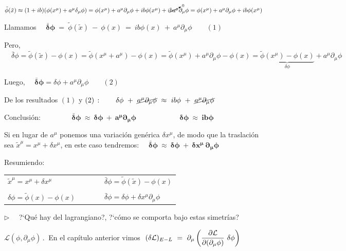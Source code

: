 $\tilde \phi(\tilde x)\approx (1+ib)(\phi(x^\mu)+a^\mu \delta_\mu \phi)=
\phi(x^\mu)+a^\mu \partial_\mu \phi+ ib \phi(x^\mu)+i \cancelto{0}{b a^\mu} \partial_\mu \phi=\phi(x^\mu)+a^\mu \partial_\mu \phi+ ib \phi(x^\mu)$


Llamamos $\quad \boldsymbol{\bar \delta \phi} \ = \ \tilde \phi(\tilde x) \ - \ \phi(x) \ = \ ib \phi(x) \ + \ a^\mu \partial_\mu \phi \qquad (1)$

Pero, $\quad \bar \delta \phi= \tilde \phi(\tilde x) -\phi(x)=\tilde \phi(x^\mu+a^\mu)-\phi(x)= \tilde \phi(x^\mu)+a^\mu \partial_\mu \phi - \phi(x)= \underbrace{ \tilde \phi(x^\mu)-\phi(x) }_{\delta \phi} + a^\mu \partial_\mu \phi$

Luego, $\quad \boldsymbol{ \bar \delta \phi}=\delta \phi +a^\mu \partial_\mu \phi \qquad (2)$

De los resultados $(1)$ y $(2)\, : \qquad \delta \phi \ + \ \cancel{ a^\mu \partial_\mu \phi} \  \approx \  ib \phi \ +\ \cancel{ a^\mu \partial_\mu \phi}$

Conclusión: $\qquad \qquad \boldsymbol{\bar \delta \phi \ \approx \ \delta \phi \ + \ a^\mu \partial_\mu \phi  \qquad \qquad \qquad \delta \phi \ \approx \ ib\phi }$

\vspace{5mm} Si en lugar de $a^\mu$ ponemos una variación genérica $\delta x^\mu$, de modo que la traslación sea $\tilde x^\mu = x^\mu+\delta x^\mu$, en este caso tendremos: $\quad \boldsymbol{\bar \delta \phi \ \approx \ \delta \phi \ + \ \delta x^\mu \ \partial_\mu \phi}$

Resumiendo:

\begin{table}[H]
\center
\begin{tabular}{lll}
$\tilde x^\mu = x^\mu+\delta x^\mu$  &  $\qquad$ &  $\bar \delta \phi=\tilde \phi (\tilde x)-\phi(x)$ \\ \\
$\delta \phi=\tilde \phi(x)-\phi(x)$ &  $\qquad$ &  $\bar \delta \phi=\delta \phi+\delta x^\mu \partial_\mu \phi$
\end{tabular}
\end{table}

\vspace{5mm} $\triangleright \quad$ ?`Qué hay del lagrangiano?, ?`cómo se comporta bajo estas simetrías?

$\mathcal L(\phi, \partial_\mu \phi)\, . \ $ En el capítulo anterior vimos $\ \displaystyle (\delta \mathcal L)_{E-L} \ = \ \partial_\mu \left( \pdv{\mathcal L}{(\partial_\mu \phi)} \ \delta \phi \right)$

